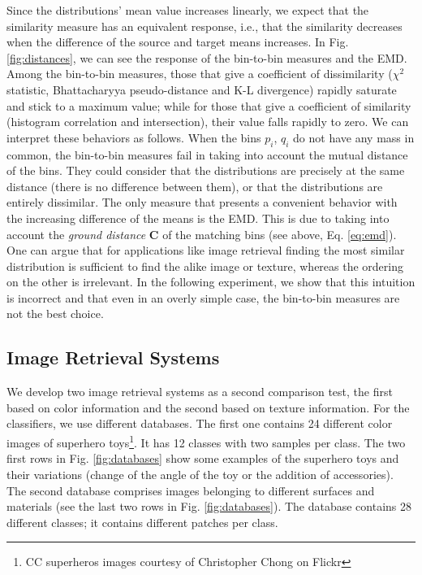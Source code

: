 Since the distributions' mean value increases linearly, we expect that the similarity measure has an equivalent response, i.e., that the similarity decreases when the difference of the source and target means increases. In Fig. \ref{fig:distances}, we can see the response of the bin-to-bin measures and the EMD. Among the bin-to-bin measures, those that give a coefficient of dissimilarity ($\chi^2$ statistic, Bhattacharyya pseudo-distance and K-L divergence) rapidly saturate and stick to a maximum value; while for those that give a coefficient of similarity (histogram correlation and intersection), their value falls rapidly to zero. We can interpret these behaviors as follows. When the bins $p_i$, $q_i$ do not have any mass in common, the bin-to-bin measures fail in taking into account the mutual distance of the bins. They could consider that the distributions are precisely at the same distance (there is no difference between them), or that the distributions are entirely dissimilar. The only measure that presents a convenient behavior with the increasing difference of the means is the EMD. This is due to taking into account the \textit{ground distance} $\mathbf{C}$ of the matching bins (see above, Eq. \eqref{eq:emd}). One can argue that for applications like image retrieval finding the most similar distribution is sufficient to find the alike image or texture, whereas the ordering on the other is irrelevant. In the following experiment, we show that this intuition is incorrect and that even in an overly simple case, the bin-to-bin measures are not the best choice.
 
\subsection{Image Retrieval Systems}
We develop two image retrieval systems as a second comparison test, the first based on color information and the second based on texture information. For the classifiers, we use different databases. The first one contains 24 different color images of superhero toys\footnote{CC superheros images courtesy of Christopher Chong on Flickr}. It has 12 classes with two samples per class. The two first rows in Fig. \ref{fig:databases} show some examples of the superhero toys and their variations (change of the angle of the toy or the addition of accessories). The second database \citep{Kylberg:Dataset:2011} comprises images belonging to different surfaces and materials (see the last two rows in Fig. \ref{fig:databases}). The database contains 28 different classes; it contains different patches per class. 


